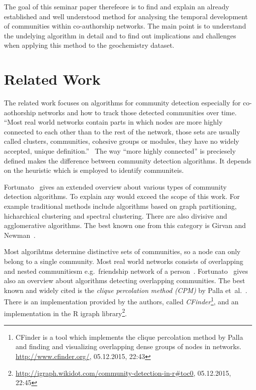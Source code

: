 \documentclass[runningheads,a4paper]{llncs}
\begin{document}
The goal of this seminar paper therefeore is to find and explain an already established and well understood method for analysing the temporal development of communities within co-authorship networks. The main point is to understand the undelying algorithm in detail and to find out implications and challenges when applying this method to the geochemistry dataset.

\section{Related Work}
\label{related}
The related work focuses on algorithms for community detection especially for co-aothorship networks and how to track those detected communities over time.
``Most real world networks contain parts in which nodes are more highly connected to each other than to the rest of the network, those sets are usually called clusters, communities, cohesive groups or modules, they have no widely accepted, unique definition.''~\cite{palla2005uncovering}
The way ``more highly connected'' is preciesely defined makes the difference between community detection algorithms.
It depends on the heuristic which is employed to identify communiteis.~\cite{porter2009communities}

Fortunato~\cite{fortunato2010community} gives an extended overview about various types of community detection algorithms.
To explain any would exceed the scope of this work.
For example traditional methods include algorithms based on graph partitioning, hicharchical clustering and spectral clustering.
There are also divisive and agglomerative algorithms.
The best known one from this category is Girvan and Newman~\cite{girvan2002community}.

Most algorihtms determine distinctive sets of communities, so a node can only belong to a single community. Most real world networks  consists of overlapping and nested communitiesm e.g.~friendship network of a person~\cite{palla2005uncovering}.
Fortunato~\cite{fortunato2010community} gives also an overview about algorithms detecting overlapping communities.
The best known and widely cited is the \emph{clique percolation method (CPM)} by Palla et~al.~\cite{palla2005uncovering}.
There is an implementation provided by the authors, called \emph{CFinder}\footnote{CFinder is a tool which implements the clique percolation method by Palla and finding and visualizing overlapping dense groups of nodes in networks. \url{http://www.cfinder.org/}, 05.12.2015, 22:43}, and an implementation in the R igraph library\footnote{\url{http://igraph.wikidot.com/community-detection-in-r#toc0}, 05.12.2015, 22:45}.
\end{document}
